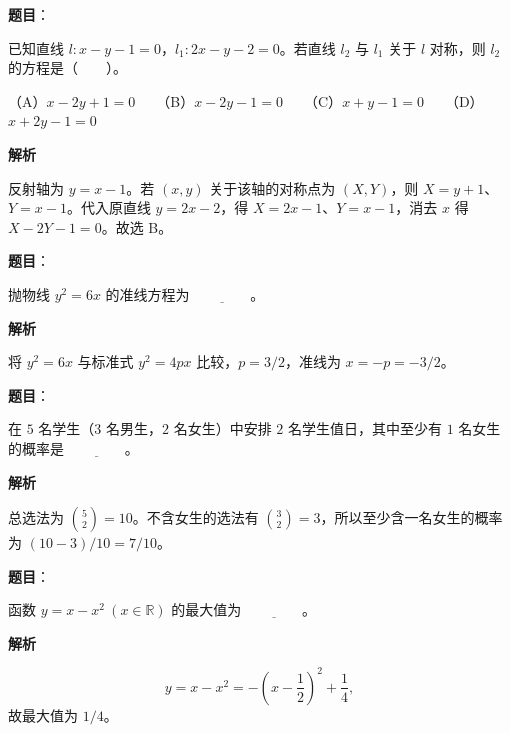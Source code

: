 \begin{answer}

\textbf{题目}：

已知直线 $l:x-y-1=0$，$l_1:2x-y-2=0$。若直线 $l_2$ 与 $l_1$ 关于 $l$ 对称，则 $l_2$ 的方程是\mbox{（　　）}。

（A）$x-2y+1=0$　　（B）$x-2y-1=0$　　（C）$x+y-1=0$　　（D）$x+2y-1=0$

\textbf{解析}

反射轴为 $y=x-1$。若 $(x,y)$ 关于该轴的对称点为 $(X,Y)$，则 $X=y+1$、$Y=x-1$。代入原直线 $y=2x-2$，得 $X=2x-1$、$Y=x-1$，消去 $x$ 得 $X-2Y-1=0$。故选 B。


\end{answer}
\begin{answer}

\textbf{题目}：

抛物线 $y^2=6x$ 的准线方程为 $\underline{\qquad\qquad}$。

\textbf{解析}

将 $y^2=6x$ 与标准式 $y^2=4px$ 比较，$p=3/2$，准线为 $x=-p=-3/2$。


\end{answer}
\begin{answer}

\textbf{题目}：

在 $5$ 名学生（$3$ 名男生，$2$ 名女生）中安排 $2$ 名学生值日，其中至少有 $1$ 名女生的概率是 $\underline{\qquad\qquad}$。

\textbf{解析}

总选法为 $\binom52=10$。不含女生的选法有 $\binom32=3$，所以至少含一名女生的概率为 $(10-3)/10=7/10$。


\end{answer}
\begin{answer}

\textbf{题目}：

函数 $y=x-x^2\ (x\in\mathbb{R})$ 的最大值为 $\underline{\qquad\qquad}$。

\textbf{解析}

\nopagebreak[4]
\[
y=x-x^2=-\left(x-\frac12\right)^2+\frac14,
\]
故最大值为 $1/4$。


\end{answer}
